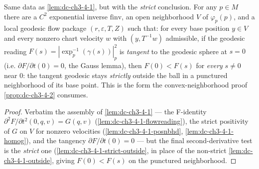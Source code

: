 \begin{lemma}
  \label{lem:dc-ch3-4-1-strict}
  \leanok
  Same data as \cref{lem:dc-ch3-4-1}, but with the \emph{strict} conclusion. For any
  $p\in M$ there are a $C^2$ exponential inverse $\mathrm{finv}$, an open neighborhood
  $V$ of $\varphi_p(p)$, and a local geodesic flow package $(r,\varepsilon,T,Z)$ such
  that: for every base position $y\in V$ and every nonzero chart velocity $w$ with
  $(y,T^{-1}w)$ admissible, if the geodesic reading $F(s)=|\exp_p^{-1}(\gamma(s))|_p^2$
  is \emph{tangent} to the geodesic sphere at $s=0$ (i.e. $\partial F/\partial t(0)=0$,
  the Gauss lemma), then $F(0)<F(s)$ for \emph{every} $s\neq0$ near $0$: the tangent
  geodesic stays \emph{strictly} outside the ball in a punctured neighborhood of its base
  point. This is the form the convex-neighborhood proof \cref{prop:dc-ch3-4-2} consumes.
\end{lemma}
\begin{proof}
  \sketch
  \leanok
  Verbatim the assembly of \cref{lem:dc-ch3-4-1} — the F-identity
  $\partial^2 F/\partial t^2(0,q,v)=G(q,v)$ (\cref{lem:dc-ch3-4-1-flowreading}), the strict
  positivity of $G$ on $V$ for nonzero velocities (\cref{lem:dc-ch3-4-1-posnbhd},
  \cref{lem:dc-ch3-4-1-homog}), and the tangency $\partial F/\partial t(0)=0$ — but the
  final second-derivative test is the \emph{strict} one (\cref{lem:dc-ch3-4-1-strict-outside},
  in place of the non-strict
  \cref{lem:dc-ch3-4-1-outside}, giving $F(0)<F(s)$ on the punctured neighborhood.
\end{proof}

